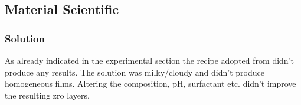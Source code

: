 \subsection{Material Scientific}
\subsubsection{Solution}
As already indicated in the experimental section the recipe adopted from \cite{Anwar2017} didn't produce any  results. 
The solution was milky/cloudy and didn't produce homogeneous films. 
Altering the composition, pH, surfactant etc. didn't improve the resulting \gls{zro} layers. 

